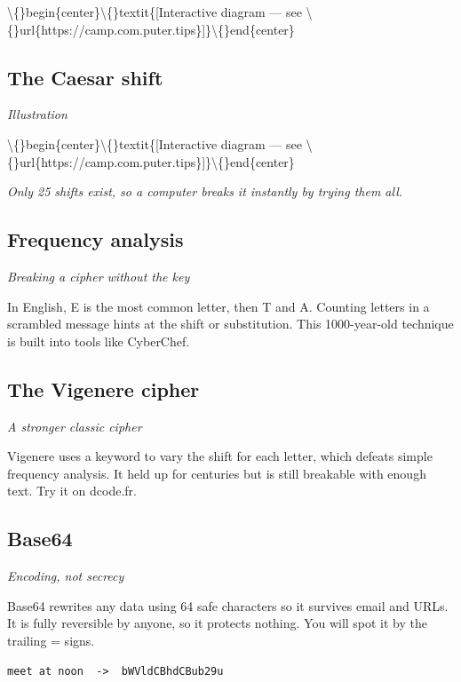 \documentclass[12pt,openany]{book}
\begin{document}
\textbackslash\{\}begin\{center\}\textbackslash\{\}textit\{[Interactive diagram --- see \textbackslash\{\}url\{https://camp.com.puter.tips\}]\}\textbackslash\{\}end\{center\}

\medskip

\subsection*{The Caesar shift}
{\small\itshape\color{gray}Illustration}

\textbackslash\{\}begin\{center\}\textbackslash\{\}textit\{[Interactive diagram --- see \textbackslash\{\}url\{https://camp.com.puter.tips\}]\}\textbackslash\{\}end\{center\}

{\small\itshape\color{gray}Only 25 shifts exist, so a computer breaks it instantly by trying them all.}

\medskip

\subsection*{Frequency analysis}
{\small\itshape\color{gray}Breaking a cipher without the key}


In English, E is the most common letter, then T and A. Counting letters in a scrambled message hints at the shift or substitution. This 1000-year-old technique is built into tools like CyberChef.

\medskip

\subsection*{The Vigenere cipher}
{\small\itshape\color{gray}A stronger classic cipher}


Vigenere uses a keyword to vary the shift for each letter, which defeats simple frequency analysis. It held up for centuries but is still breakable with enough text. Try it on dcode.fr.

\medskip

\subsection*{Base64}
{\small\itshape\color{gray}Encoding, not secrecy}


Base64 rewrites any data using 64 safe characters so it survives email and URLs. It is fully reversible by anyone, so it protects nothing. You will spot it by the trailing = signs.

\begin{lstlisting}
meet at noon  ->  bWVldCBhdCBub29u\end{lstlisting}
\end{document}
